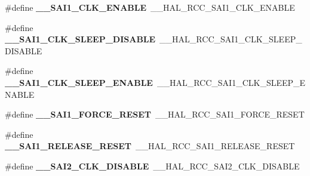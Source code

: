 \begin{DoxyCompactItemize}
\item 
\#define {\bfseries \+\_\+\+\_\+\+S\+A\+I1\+\_\+\+C\+L\+K\+\_\+\+E\+N\+A\+B\+LE}~\+\_\+\+\_\+\+H\+A\+L\+\_\+\+R\+C\+C\+\_\+\+S\+A\+I1\+\_\+\+C\+L\+K\+\_\+\+E\+N\+A\+B\+LE\hypertarget{group___h_a_l___r_c_c___aliased_gafa304625058568d2853a58c18d3a57f0}{}\label{group___h_a_l___r_c_c___aliased_gafa304625058568d2853a58c18d3a57f0}

\item 
\#define {\bfseries \+\_\+\+\_\+\+S\+A\+I1\+\_\+\+C\+L\+K\+\_\+\+S\+L\+E\+E\+P\+\_\+\+D\+I\+S\+A\+B\+LE}~\+\_\+\+\_\+\+H\+A\+L\+\_\+\+R\+C\+C\+\_\+\+S\+A\+I1\+\_\+\+C\+L\+K\+\_\+\+S\+L\+E\+E\+P\+\_\+\+D\+I\+S\+A\+B\+LE\hypertarget{group___h_a_l___r_c_c___aliased_gad86ef4770d1d2e32c8395ff14dd9fb3e}{}\label{group___h_a_l___r_c_c___aliased_gad86ef4770d1d2e32c8395ff14dd9fb3e}

\item 
\#define {\bfseries \+\_\+\+\_\+\+S\+A\+I1\+\_\+\+C\+L\+K\+\_\+\+S\+L\+E\+E\+P\+\_\+\+E\+N\+A\+B\+LE}~\+\_\+\+\_\+\+H\+A\+L\+\_\+\+R\+C\+C\+\_\+\+S\+A\+I1\+\_\+\+C\+L\+K\+\_\+\+S\+L\+E\+E\+P\+\_\+\+E\+N\+A\+B\+LE\hypertarget{group___h_a_l___r_c_c___aliased_ga930f613f28d57aaec974d8a0e611c373}{}\label{group___h_a_l___r_c_c___aliased_ga930f613f28d57aaec974d8a0e611c373}

\item 
\#define {\bfseries \+\_\+\+\_\+\+S\+A\+I1\+\_\+\+F\+O\+R\+C\+E\+\_\+\+R\+E\+S\+ET}~\+\_\+\+\_\+\+H\+A\+L\+\_\+\+R\+C\+C\+\_\+\+S\+A\+I1\+\_\+\+F\+O\+R\+C\+E\+\_\+\+R\+E\+S\+ET\hypertarget{group___h_a_l___r_c_c___aliased_ga6fa8759253db7e8a4feaf7e4f5e40a3e}{}\label{group___h_a_l___r_c_c___aliased_ga6fa8759253db7e8a4feaf7e4f5e40a3e}

\item 
\#define {\bfseries \+\_\+\+\_\+\+S\+A\+I1\+\_\+\+R\+E\+L\+E\+A\+S\+E\+\_\+\+R\+E\+S\+ET}~\+\_\+\+\_\+\+H\+A\+L\+\_\+\+R\+C\+C\+\_\+\+S\+A\+I1\+\_\+\+R\+E\+L\+E\+A\+S\+E\+\_\+\+R\+E\+S\+ET\hypertarget{group___h_a_l___r_c_c___aliased_ga9348bdfef0e79a335e4c4c00cdd77e18}{}\label{group___h_a_l___r_c_c___aliased_ga9348bdfef0e79a335e4c4c00cdd77e18}

\item 
\#define {\bfseries \+\_\+\+\_\+\+S\+A\+I2\+\_\+\+C\+L\+K\+\_\+\+D\+I\+S\+A\+B\+LE}~\+\_\+\+\_\+\+H\+A\+L\+\_\+\+R\+C\+C\+\_\+\+S\+A\+I2\+\_\+\+C\+L\+K\+\_\+\+D\+I\+S\+A\+B\+LE\hypertarget{group___h_a_l___r_c_c___aliased_gadec8489576c1a83913f620c66517bff6}{}\label{group___h_a_l___r_c_c___aliased_gadec8489576c1a83913f620c66517bff6}


\end{DoxyCompactItemize}
